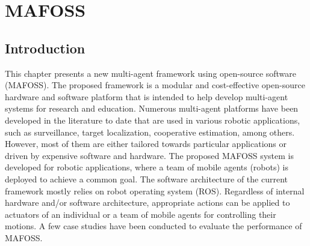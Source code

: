 \newcommand{\package}[1]{\textbf{#1}} %
\newcommand{\cmmd}[1]{\textbackslash\texttt{#1}} %


\chapter{MAFOSS}
\label{chap:MAFOSS}


\section{Introduction}
\label{sec:introductionMAFOSS}
This chapter presents a new multi-agent framework using open-source software (MAFOSS). The proposed framework is a modular and cost-effective open-source hardware and software platform that is intended to help develop multi-agent systems for research and education.  Numerous multi-agent platforms have been developed in the literature to date that are used in various robotic applications, such as surveillance, target localization, cooperative estimation, among others. However, most of them are either tailored towards particular applications or driven by expensive software and hardware. The proposed MAFOSS system is developed for robotic applications, where a team of mobile agents (robots) is deployed to achieve a common goal. The software architecture of the current framework mostly relies on robot operating system (ROS). Regardless of internal hardware and/or software architecture, appropriate actions can be applied to actuators of an individual or a team of mobile agents for controlling their motions. A few case studies have been conducted to evaluate the performance of MAFOSS.



